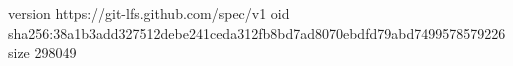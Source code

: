 version https://git-lfs.github.com/spec/v1
oid sha256:38a1b3add327512debe241ceda312fb8bd7ad8070ebdfd79abd7499578579226
size 298049
